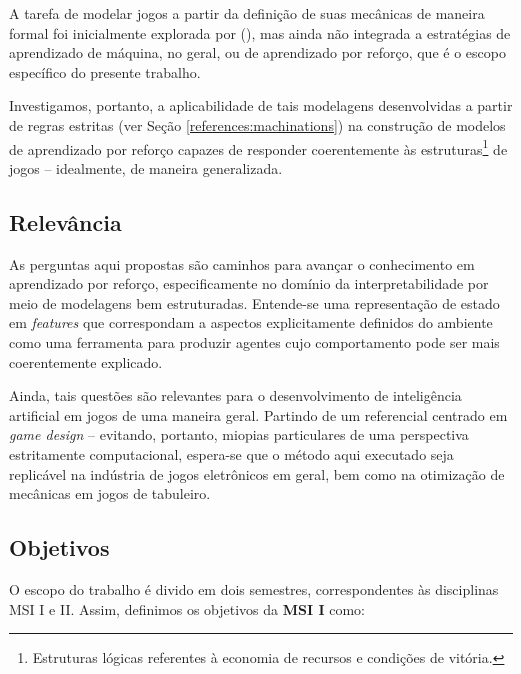 \documentclass[10pt,a4paper]{article}
\begin{document}
A tarefa de modelar jogos a partir da definição de suas mecânicas de maneira formal foi inicialmente explorada por \citeauthor{machinations} (\citeyear{machinations}), mas ainda não integrada a estratégias de aprendizado de máquina, no geral, ou de aprendizado por reforço, que é o escopo específico do presente trabalho.

Investigamos, portanto, a aplicabilidade de tais modelagens desenvolvidas a partir de regras estritas (ver Seção \ref{references:machinations}) na construção de modelos de aprendizado por reforço capazes de responder coerentemente às estruturas\footnote{Estruturas lógicas referentes à economia de recursos e condições de vitória.} de jogos -- idealmente, de maneira generalizada.

\subsection{Relevância}
\label{relevance}

As perguntas aqui propostas são caminhos para avançar o conhecimento em aprendizado por reforço, especificamente no domínio da interpretabilidade por meio de modelagens bem estruturadas. Entende-se uma representação de estado em \textit{features} que correspondam a aspectos explicitamente definidos do ambiente como uma ferramenta para produzir agentes cujo comportamento pode ser mais coerentemente explicado.

Ainda, tais questões são relevantes para o desenvolvimento de inteligência artificial em jogos de uma maneira geral. Partindo de um referencial centrado em \textit{game design} -- evitando, portanto, miopias particulares de uma perspectiva estritamente computacional, espera-se que o método aqui executado seja replicável na indústria de jogos eletrônicos em geral, bem como na otimização de mecânicas em jogos de tabuleiro.

\subsection{Objetivos}
\label{goals}

O escopo do trabalho é divido em dois semestres, correspondentes às disciplinas MSI I e II. Assim, definimos os objetivos da \textbf{MSI I} como:
\end{document}

